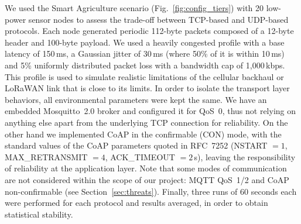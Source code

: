 \documentclass[jsan,article,submit,moreauthors,pdftex]{Definitions/mdpi}
\begin{document}
We used the Smart Agriculture scenario (Fig.~\ref{fig:config_tiers}) with 20 low-power sensor nodes to assess the trade-off between TCP-based and UDP-based protocols. Each node generated periodic 112-byte packets composed of a 12-byte header and 100-byte payload. We used a heavily congested profile with a base latency of 150\,ms, a Gaussian jitter of 30\,ms (where 50\% of it is within 10\,ms) and 5\% uniformly distributed packet loss with a bandwidth cap of 1{,}000\,kbps. This profile is used to simulate realistic limitations of the cellular backhaul or LoRaWAN link that is close to its limits. In order to isolate the transport layer behaviors, all environmental parameters were kept the same. We have an embedded Mosquitto~2.0 broker and configured it for QoS~0, thus not relying on anything else apart from the underlying TCP connection for reliability. On the other hand we implemented CoAP in the confirmable (CON) mode, with the standard values of the CoAP parameters quoted in RFC~7252 (NSTART $=1$, MAX\_RETRANSMIT $=4$, ACK\_TIMEOUT $=2$\,s), leaving the responsibility of reliability at the application layer. Note that some modes of communication are not considered within the scope of our project: MQTT QoS~1/2 and CoAP non-confirmable (see Section~\ref{sec:threats}). Finally, three runs of 60 seconds each were performed for each protocol and results averaged, in order to obtain statistical stability.
\end{document}
